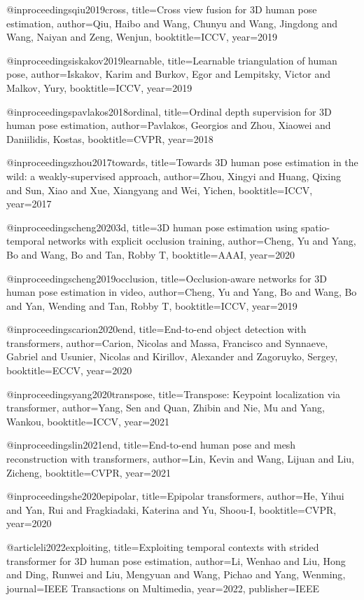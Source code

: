 @inproceedings{qiu2019cross,
  title={Cross view fusion for {3D} human pose estimation},
  author={Qiu, Haibo and Wang, Chunyu and Wang, Jingdong and Wang, Naiyan and Zeng, Wenjun},
  booktitle=ICCV,
  year={2019}
}

@inproceedings{iskakov2019learnable,
  title={Learnable triangulation of human pose},
  author={Iskakov, Karim and Burkov, Egor and Lempitsky, Victor and Malkov, Yury},
  booktitle=ICCV,
  year={2019}
}

@inproceedings{pavlakos2018ordinal,
  title={Ordinal depth supervision for {3D} human pose estimation},
  author={Pavlakos, Georgios and Zhou, Xiaowei and Daniilidis, Kostas},
  booktitle=CVPR,
  year={2018}
}

@inproceedings{zhou2017towards,
  title={Towards {3D} human pose estimation in the wild: a weakly-supervised approach},
  author={Zhou, Xingyi and Huang, Qixing and Sun, Xiao and Xue, Xiangyang and Wei, Yichen},
  booktitle=ICCV,
  year={2017}
}

@inproceedings{cheng20203d,
  title={{3D} human pose estimation using spatio-temporal networks with explicit occlusion training},
  author={Cheng, Yu and Yang, Bo and Wang, Bo and Tan, Robby T},
  booktitle=AAAI,
  year={2020}
}

@inproceedings{cheng2019occlusion,
  title={Occlusion-aware networks for {3D} human pose estimation in video},
  author={Cheng, Yu and Yang, Bo and Wang, Bo and Yan, Wending and Tan, Robby T},
  booktitle=ICCV,
  year={2019}
}

@inproceedings{carion2020end,
  title={End-to-end object detection with transformers},
  author={Carion, Nicolas and Massa, Francisco and Synnaeve, Gabriel and Usunier, Nicolas and Kirillov, Alexander and Zagoruyko, Sergey},
  booktitle=ECCV,
  year={2020}
}

@inproceedings{yang2020transpose,
  title={Transpose: Keypoint localization via transformer},
  author={Yang, Sen and Quan, Zhibin and Nie, Mu and Yang, Wankou},
  booktitle=ICCV,
  year={2021}
}

@inproceedings{lin2021end,
  title={End-to-end human pose and mesh reconstruction with transformers},
  author={Lin, Kevin and Wang, Lijuan and Liu, Zicheng},
  booktitle=CVPR,
  year={2021}
}

@inproceedings{he2020epipolar,
  title={Epipolar transformers},
  author={He, Yihui and Yan, Rui and Fragkiadaki, Katerina and Yu, Shoou-I},
  booktitle=CVPR,
  year={2020}
}

@article{li2022exploiting,
  title={Exploiting temporal contexts with strided transformer for {3D} human pose estimation},
  author={Li, Wenhao and Liu, Hong and Ding, Runwei and Liu, Mengyuan and Wang, Pichao and Yang, Wenming},
  journal={IEEE Transactions on Multimedia},
  year={2022},
  publisher={IEEE}
}

